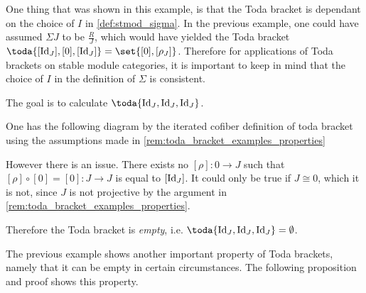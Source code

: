 One thing that was shown in this example, is that the Toda bracket is dependant on the choice of \( I \) in \autoref{def:stmod_sigma}. In the previous example, one could have assumed \( \Sigma J \) to be \( \frac{R}{J} \), which would have yielded the Toda bracket \( \toda{[\Id_J], [0], [\Id_J]} = \set{[0], [\rho_J]} \). Therefore for applications of Toda brackets on stable module categories, it is important to keep in mind that the choice of \( I \) in the definition of \( \Sigma \) is consistent.

\begin{example}
	\label{ex:toda_bracket-1}
	The goal is to calculate \( \toda{\Id_J, \Id_J, \Id_J} \).

	One has the following diagram by the iterated cofiber definition of toda bracket using the assumptions made in \autoref{rem:toda_bracket_examples_properties}
	\begin{center}
	\end{center}

	However there is an issue. There exists no \( [\rho]: 0 \to J \) such that \( [\rho] \circ [0] = [0]: J \to J \) is equal to \( [\operatorname{Id}_J] \). It could only be true if \( J \cong 0 \), which it is not, since \( J \) is not projective by the argument in \autoref{rem:toda_bracket_examples_properties}.

	Therefore the Toda bracket is \emph{empty}, i.e. \( \toda{\Id_J, \Id_J, \Id_J} = \emptyset \).
\end{example}

The previous example shows another important property of Toda brackets, namely that it can be empty in certain circumstances. The following proposition and proof shows this property.

